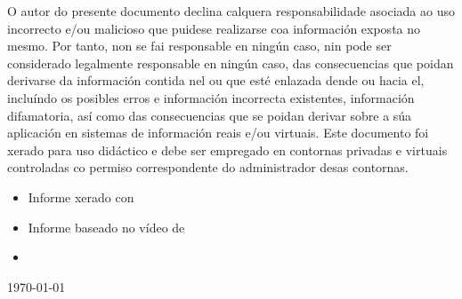 \documentclass[a4paper]{article}
\newcommand{\startDate}{\today}
\begin{document}
\begin{titlepage}
\begin{adjustbox}{width=0.9\paperwidth,center}
        \end{adjustbox}
        \vspace*{-0.6cm} 
        \begin{tcolorbox}[enhanced,attach boxed title to top center={yshift=-1mm,yshifttext=-1mm},
        colback=red!5!white,colframe=red!75!black,colbacktitle=red!90!black,
  title=LIMITACIÓN DE RESPONSABILIDADE,fonttitle=\bfseries,
  boxed title style={size=small,colframe=red!75!black} ]
               O autor do presente documento declina calquera responsabilidade asociada ao uso incorrecto e/ou malicioso que puidese realizarse coa información exposta no mesmo. Por tanto, non se fai responsable en ningún caso, nin pode ser considerado legalmente responsable en ningún caso, das consecuencias que poidan derivarse da información contida nel ou que esté enlazada dende ou hacia el, incluíndo os posibles erros e información incorrecta existentes, información difamatoria, así como das consecuencias que se poidan derivar sobre a súa aplicación en sistemas de información reais e/ou virtuais. Este documento foi xerado para uso didáctico e debe ser empregado en contornas privadas e virtuais controladas co permiso correspondente do administrador desas contornas.
        \end{tcolorbox}
        \begin{tcolorbox}[enhanced,attach boxed title to top center={yshift=-3mm,yshifttext=-1mm},
  colback=blue!5!white,colframe=blue!75!black,colbacktitle=green!80!black,
  title=De Interese,fonttitle=\bfseries,
  boxed title style={size=small,colframe=red!50!black} ]
  \centering
        \begin{itemize}[leftmargin=5.5mm]
        \item Informe xerado con \href{https://www.latex-project.org/}{\color{blue}{\LaTeX}}
        \item Informe baseado no vídeo de \href{https://youtu.be/riNRHoEOBeU}{\color{blue}{S4vitar: Cómo crear un reporte profesional en LaTeX}}
        \item \href{https://github.com/ricardofc/repoEDU-CCbySA/tree/main/SI/Pentester/}{\color{blue}{https://github.com/ricardofc/repoEDU-CCbySA/tree/main/SI/Pentester/}}
        \end{itemize}
\end{tcolorbox}
        {\large \startDate \par}
        \end{titlepage}
\end{document}
